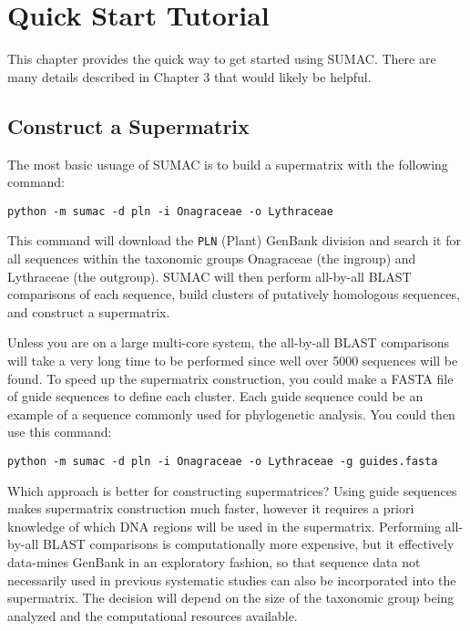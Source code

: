 \documentclass[12pt]{report}
\begin{document}

\chapter{Quick Start Tutorial}

This chapter provides the quick way to get started using SUMAC. 
There are many details described in Chapter 3 that
would likely be helpful.

\section{Construct a Supermatrix}

The most basic usuage of SUMAC is to build a supermatrix with the following
command:

\begin{verbatim}
python -m sumac -d pln -i Onagraceae -o Lythraceae
\end{verbatim}

This command will download the \verb|PLN|
(Plant) GenBank division and search it for all sequences within
the taxonomic groups Onagraceae (the ingroup) and Lythraceae (the outgroup).
SUMAC will then perform all-by-all BLAST comparisons of each sequence, 
build clusters of putatively homologous sequences, and 
construct a supermatrix. 

Unless you are on a large multi-core system, the all-by-all BLAST comparisons
will take a very long time to be performed since well over 5000 sequences
will be found.
To speed up the supermatrix construction, you could make a FASTA file
of guide sequences to define each cluster. Each guide
sequence could be an example of a sequence commonly used for phylogenetic
analysis. 
You could then use this command:

\begin{verbatim}
python -m sumac -d pln -i Onagraceae -o Lythraceae -g guides.fasta
\end{verbatim}

Which approach is better for constructing supermatrices?
Using guide sequences makes supermatrix construction much faster, however
it requires a priori knowledge of which DNA regions will be used
in the supermatrix.
Performing all-by-all BLAST comparisons is computationally
more expensive, but it effectively data-mines GenBank in an exploratory
fashion, so that sequence data not necessarily used in previous systematic
studies can also be incorporated into the supermatrix.
The decision will depend on the size of the taxonomic group being
analyzed and the computational resources available.
\end{document}
